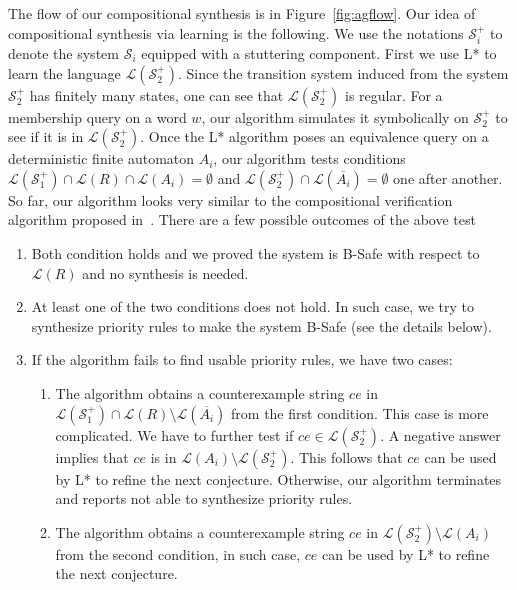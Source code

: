\documentclass[10pt, a4paper, onecolumn, conference, compsocconf]{IEEEtran}
\begin{document}
The flow of our compositional synthesis is in Figure~\ref{fig:agflow}. Our idea of compositional synthesis via learning is the following. We use the notations $\mathcal{S}_{i}^+$ to denote the system $\mathcal{S}_{i}$ equipped with a stuttering component.
First we use L* to learn the language $\mathcal{L}(\mathcal{S}_{2}^+)$. Since the transition system induced from the system $\mathcal{S}_{2}^+$ has finitely many states, one can see that $\mathcal{L}(\mathcal{S}_{2}^+)$ is regular. For a membership query on a word $w$, our algorithm simulates it symbolically on $\mathcal{S}_{2}^+$ to see if it is in $\mathcal{L}(\mathcal{S}_{2}^+)$. Once the L* algorithm poses an equivalence query on a deterministic finite automaton $A_i$, our algorithm tests conditions $\mathcal{L}(\mathcal{S}_{1}^+)\cap \mathcal{L}(R) \cap \mathcal{L}(A_i) = \emptyset$ and $\mathcal{L}(\mathcal{S}_{2}^+)\cap \mathcal{L}(\overline{A_i})=\emptyset$ one after another.
So far, our algorithm looks very similar to the compositional verification algorithm proposed in~\cite{cobleigh2003learning}.
There are a few possible outcomes of the above test
 \begin{enumerate}
   \item Both condition holds and we proved the system is B-Safe with respect to $\mathcal{L}(R)$ and no synthesis is needed.
   \item At least one of the two conditions does not hold. In such case, we try to synthesize priority rules to make the system B-Safe (see the details below).
   \item If the algorithm fails to find usable priority rules, we have two cases:
   \begin{enumerate}
     \item The algorithm obtains a counterexample string $ce$ in $\mathcal{L}(\mathcal{S}_{1}^+)\cap \mathcal{L}(R) \setminus \mathcal{L}(\overline{A_i})$ from the first condition. This case is more complicated. We have to further test if $ce\in \mathcal{L}(\mathcal{S}_{2}^+)$. A negative answer implies that $ce$ is in $\mathcal{L}(A_i) \setminus \mathcal{L}(\mathcal{S}_{2}^+)$. This follows that $ce$ can be used by L* to refine the next conjecture. Otherwise, our algorithm terminates and reports not able to synthesize priority rules.
     \item The algorithm obtains a counterexample string $ce$ in $\mathcal{L}(\mathcal{S}_{2}^+) \setminus \mathcal{L}(A_i)$ from the second condition, in such case, $ce$ can be used by L* to refine the next conjecture.
   \end{enumerate}
 \end{enumerate}
\end{document}
